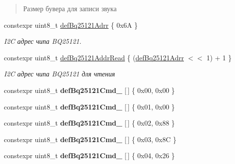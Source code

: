 \begin{DoxyCompactItemize}
\begin{DoxyCompactList}
\begin{quote}
Размер бувера для записи звука \end{quote}
\end{DoxyCompactList}\item 
\mbox{\label{namespaceunit_af46d6c2767dafd308cf474c40fbeb8ec}} 
constexpr uint8\+\_\+t \hyperlink{namespaceunit_af46d6c2767dafd308cf474c40fbeb8ec}{def\+Bq25121\+Adrr} \{ 0x6\+A \}
\begin{DoxyCompactList}\small\item\em I2C адрес чипа B\+Q25121. \end{DoxyCompactList}\item 
\mbox{\label{namespaceunit_a288a496e8f8769855083c088ae7560b9}} 
constexpr uint8\+\_\+t \hyperlink{namespaceunit_a288a496e8f8769855083c088ae7560b9}{def\+Bq25121\+Addr\+Read} \{ (\hyperlink{namespaceunit_af46d6c2767dafd308cf474c40fbeb8ec}{def\+Bq25121\+Adrr} $<$$<$ 1) + 1 \}
\begin{DoxyCompactList}\small\item\em I2C адрес чипа B\+Q25121 для чтения \end{DoxyCompactList}\item 
\mbox{\label{namespaceunit_ab0580f2a23a63c34bfb8d724d6a62b5a}} 
constexpr uint8\+\_\+t {\bfseries def\+Bq25121\+Cmd\+\_} \mbox{[}$\,$\mbox{]} \{ 0x00, 0x00 \}
\item 
\mbox{\label{namespaceunit_aa36516696f6f93e324939647b1a827f7}} 
constexpr uint8\+\_\+t {\bfseries def\+Bq25121\+Cmd\+\_} \mbox{[}$\,$\mbox{]} \{ 0x01, 0x00 \}
\item 
\mbox{\label{namespaceunit_a677ac2bb5fbf6c6e9c105088ac9d5414}} 
constexpr uint8\+\_\+t {\bfseries def\+Bq25121\+Cmd\+\_} \mbox{[}$\,$\mbox{]} \{ 0x02, 0x88 \}
\item 
\mbox{\label{namespaceunit_a8fb3be9b7803c7cc2c4ca90898faec3d}} 
constexpr uint8\+\_\+t {\bfseries def\+Bq25121\+Cmd\+\_} \mbox{[}$\,$\mbox{]} \{ 0x03, 0x8\+C \}
\item 
\mbox{\label{namespaceunit_abed998b1b5d20891626f3493002ddec4}} 
constexpr uint8\+\_\+t {\bfseries def\+Bq25121\+Cmd\+\_} \mbox{[}$\,$\mbox{]} \{ 0x04, 0x26 \}
\item 
$$
\end{DoxyCompactItemize}
